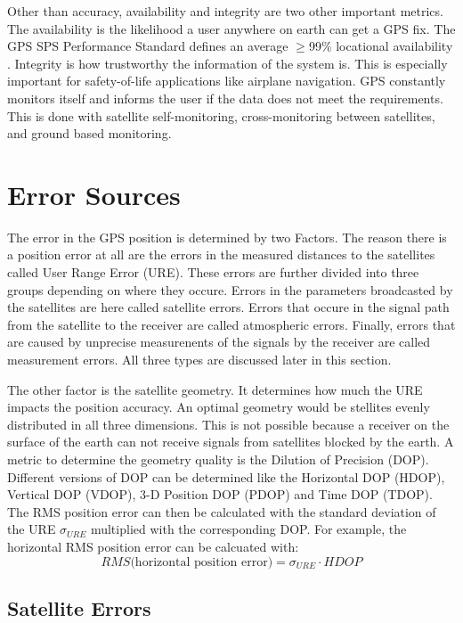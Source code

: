 Other than accuracy, availability and integrity are two other important metrics.
The availability is the likelihood a user anywhere on earth can get a GPS fix.
The GPS SPS Performance Standard defines an average $\geq$99\% locational availability \cite{SPS_Performance}.
Integrity is how trustworthy the information of the system is.
This is especially important for safety-of-life applications like airplane navigation.
GPS constantly monitors itself and informs the user if the data does not meet the requirements.
This is done with satellite self-monitoring, cross-monitoring between satellites, and ground based monitoring.


\section{Error Sources}\label{sec:error_sources}

The error in the GPS position is determined by two Factors.
The reason there is a position error at all are the errors in the measured distances to the satellites called User Range Error (URE).
These errors are further divided into three groups depending on where they occure.
Errors in the parameters broadcasted by the satellites are here called satellite errors.
Errors that occure in the signal path from the satellite to the receiver are called atmospheric errors.
Finally, errors that are caused by unprecise measurenents of the signals by the receiver are called measurement errors.
All three types are discussed later in this section.

The other factor is the satellite geometry.
It determines how much the URE impacts the position accuracy.
An optimal geometry would be stellites evenly distributed in all three dimensions.
This is not possible because a receiver on the surface of the earth can not receive signals from satellites blocked by the earth.
A metric to determine the geometry quality is the Dilution of Precision (DOP).
Different versions of DOP can be determined like the Horizontal DOP (HDOP), Vertical DOP (VDOP), 3-D Position DOP (PDOP) and Time DOP (TDOP).
The RMS position error can then be calculated with the standard deviation of the URE $\sigma_{URE}$ multiplied with the corresponding DOP.
For example, the horizontal RMS position error can be calcuated with:
\begin{equation}
 RMS \text{(horizontal position error)} = \sigma_{URE} \cdot HDOP
\end{equation}

\subsection{Satellite Errors}

